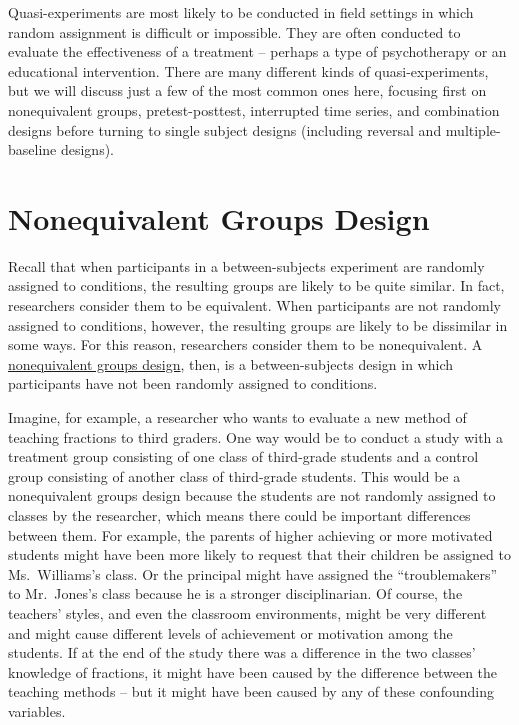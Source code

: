 \documentclass[
]{krantz}
\begin{document}
Quasi-experiments are most likely to be conducted in field settings in which random assignment is difficult or impossible. They are often conducted to evaluate the effectiveness of a treatment -- perhaps a type of psychotherapy or an educational intervention. There are many different kinds of quasi-experiments, but we will discuss just a few of the most common ones here, focusing first on nonequivalent groups, pretest-posttest, interrupted time series, and combination designs before turning to single subject designs (including reversal and multiple-baseline designs).

\section{Nonequivalent Groups Design}\label{nonequivalent-groups-design}

Recall that when participants in a between-subjects experiment are randomly assigned to conditions, the resulting groups are likely to be quite similar. In fact, researchers consider them to be equivalent. When participants are not randomly assigned to conditions, however, the resulting groups are likely to be dissimilar in some ways. For this reason, researchers consider them to be nonequivalent. A \hyperref[nonequivalent-groups-design]{nonequivalent groups design}, then, is a between-subjects design in which participants have not been randomly assigned to conditions.

Imagine, for example, a researcher who wants to evaluate a new method of teaching fractions to third graders. One way would be to conduct a study with a treatment group consisting of one class of third-grade students and a control group consisting of another class of third-grade students. This would be a nonequivalent groups design because the students are not randomly assigned to classes by the researcher, which means there could be important differences between them. For example, the parents of higher achieving or more motivated students might have been more likely to request that their children be assigned to Ms.~Williams's class. Or the principal might have assigned the ``troublemakers'' to Mr.~Jones's class because he is a stronger disciplinarian. Of course, the teachers' styles, and even the classroom environments, might be very different and might cause different levels of achievement or motivation among the students. If at the end of the study there was a difference in the two classes' knowledge of fractions, it might have been caused by the difference between the teaching methods -- but it might have been caused by any of these confounding variables.
\end{document}
